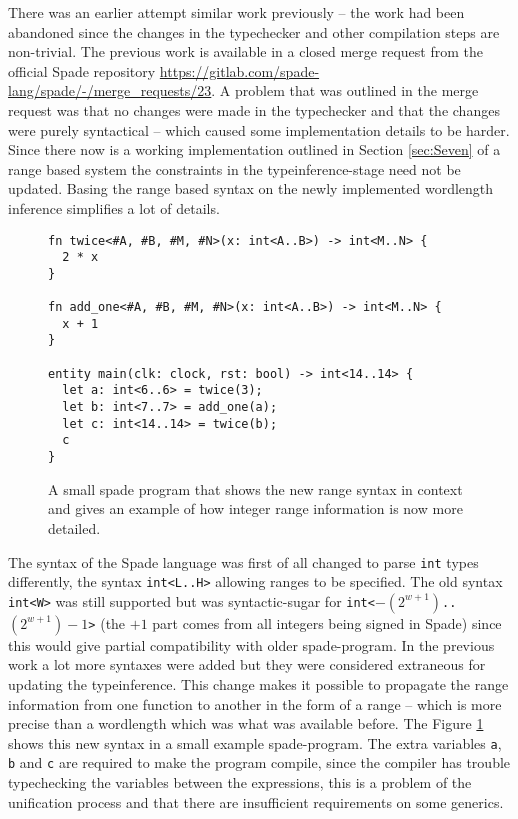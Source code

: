 There was an earlier attempt similar work previously -- the work had been abandoned since the changes in the typechecker and other compilation steps are non-trivial. The previous work is available in a closed merge request from the official Spade repository \url{https://gitlab.com/spade-lang/spade/-/merge_requests/23}. A problem that was outlined in the merge request was that no changes were made in the typechecker and that the changes were purely syntactical -- which caused some implementation details to be harder. Since there now is a working implementation outlined in Section \ref{sec:Seven} of a range based system the constraints in the typeinference-stage need not be updated. Basing the range based syntax on the newly implemented wordlength inference simplifies a lot of details.

\begin{figure}
  \begin{verbatim}
fn twice<#A, #B, #M, #N>(x: int<A..B>) -> int<M..N> {
  2 * x
}

fn add_one<#A, #B, #M, #N>(x: int<A..B>) -> int<M..N> {
  x + 1
}

entity main(clk: clock, rst: bool) -> int<14..14> {
  let a: int<6..6> = twice(3);
  let b: int<7..7> = add_one(a);
  let c: int<14..14> = twice(b);
  c
}
  \end{verbatim}
  \caption{A small spade program that shows the new range syntax in context and gives an example of how integer range information is now more detailed.}
  \label{fig:BetterProgram}
\end{figure}

The syntax of the Spade language was first of all changed to parse \verb+int+ types differently, the syntax \verb+int<L..H>+ allowing ranges to be specified. The old syntax \verb+int<W>+ was still supported but was syntactic-sugar for \verb!int<!$-(2^{w+1})$\verb!..!$(2^{w+1})-1$\verb!>! (the $+1$ part comes from all integers being signed in Spade) since this would give partial compatibility with older spade-program. In the previous work a lot more syntaxes were added but they were considered extraneous for updating the typeinference. This change makes it possible to propagate the range information from one function to another in the form of a range -- which is more precise than a wordlength which was what was available before. The Figure \ref{fig:BetterProgram} shows this new syntax in a small example spade-program. The extra variables \verb+a+, \verb+b+ and \verb+c+ are required to make the program compile, since the compiler has trouble typechecking the variables between the expressions, this is a problem of the unification process and that there are insufficient requirements on some generics.

